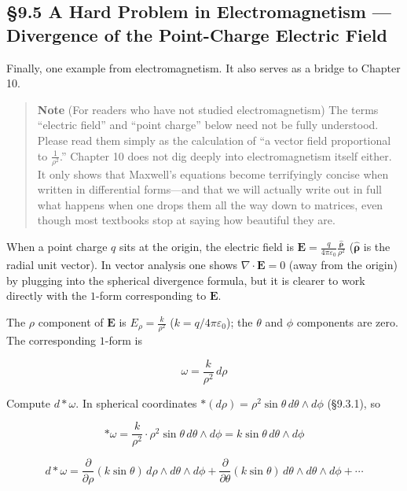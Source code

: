 \hypertarget{a-hard-problem-in-electromagnetism-divergence-of-the-point-charge-electric-field}{%
\subsection{§9.5 A Hard Problem in Electromagnetism --- Divergence of
the Point-Charge Electric
Field}\label{a-hard-problem-in-electromagnetism-divergence-of-the-point-charge-electric-field}}

Finally, one example from electromagnetism. It also serves as a bridge
to Chapter 10.

\begin{quote}
\textbf{Note} (For readers who have not studied electromagnetism) The
terms ``electric field'' and ``point charge'' below need not be fully
understood. Please read them simply as the calculation of ``a vector
field proportional to \(\frac{1}{\rho^2}\).'' Chapter 10 does not dig
deeply into electromagnetism itself either. It only shows that Maxwell's
equations become terrifyingly concise when written in differential
forms---and that we will actually write out in full what happens when
one drops them all the way down to matrices, even though most textbooks
stop at saying how beautiful they are.
\end{quote}

When a point charge \(q\) sits at the origin, the electric field is
\(\mathbf{E} = \frac{q}{4\pi\varepsilon_0}\frac{\hat{\boldsymbol{\rho}}}{\rho^2}\)
(\(\hat{\boldsymbol{\rho}}\) is the radial unit vector). In vector
analysis one shows \(\nabla\cdot\mathbf{E} = 0\) (away from the origin)
by plugging into the spherical divergence formula, but it is clearer to
work directly with the \(1\)-form corresponding to \(\mathbf{E}\).

The \(\rho\) component of \(\mathbf{E}\) is
\(E_\rho = \frac{k}{\rho^2}\) (\(k = q/4\pi\varepsilon_0\)); the
\(\theta\) and \(\phi\) components are zero. The corresponding
\(1\)-form is

\[\omega = \frac{k}{\rho^2}\,d\rho\]

Compute \(d\ast\omega\). In spherical coordinates
\(\ast(d\rho) = \rho^2\sin\theta\,d\theta\wedge d\phi\) (§9.3.1), so

\[\ast\omega = \frac{k}{\rho^2} \cdot \rho^2\sin\theta\,d\theta\wedge d\phi = k\sin\theta\,d\theta\wedge d\phi\]

\[d\ast\omega = \frac{\partial}{\partial\rho}(k\sin\theta)\,d\rho\wedge d\theta\wedge d\phi + \frac{\partial}{\partial\theta}(k\sin\theta)\,d\theta\wedge d\theta\wedge d\phi + \cdots\]

